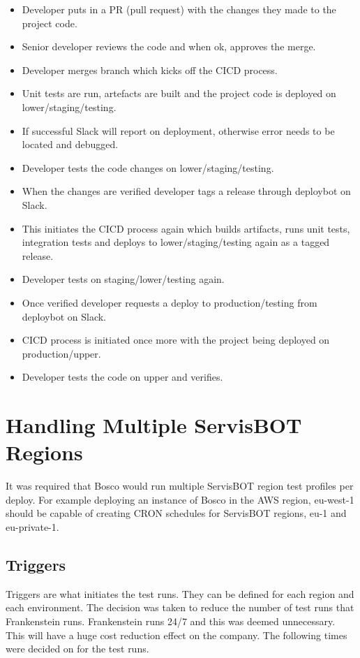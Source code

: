 \documentclass[12pt,a4paper,titlepage]{report}
\begin{document}
\begin{itemize}
  \item Developer puts in a PR (pull request) with the changes they made to the project code.
  \item Senior developer reviews the code and when ok, approves the merge.
  \item Developer merges branch which kicks off the CICD process. 
  \item Unit tests are run, artefacts are built and the project code is deployed on lower/staging/testing.
  \item If successful Slack will report on deployment, otherwise error needs to be located and debugged. 
  \item Developer tests the code changes on lower/staging/testing.
  \item When the changes are verified developer tags a release through deploybot on Slack.
  \item This initiates the CICD process again which builds artifacts, runs unit tests, integration tests and deploys to lower/staging/testing again as a tagged release.
  \item Developer tests on staging/lower/testing again.
  \item Once verified developer requests a deploy to production/testing from deploybot on Slack.
  \item CICD process is initiated once more with the project being deployed on production/upper.
  \item Developer tests the code on upper and verifies.
\end{itemize}

\section{Handling Multiple ServisBOT Regions}
It was required that Bosco would run multiple ServisBOT region test profiles per deploy. For example deploying an instance of 
Bosco in the AWS region, eu-west-1 should be capable of creating CRON schedules for ServisBOT regions, eu-1 and eu-private-1. 

\subsection{Triggers}
Triggers are what initiates the test runs. They can be defined for each region and each environment. The decision was taken 
to reduce the number of test runs that Frankenstein runs. Frankenstein runs 24/7 and this was deemed unnecessary. This will have a huge cost reduction 
effect on the company. The following times were decided on for the test runs.
\end{document}
